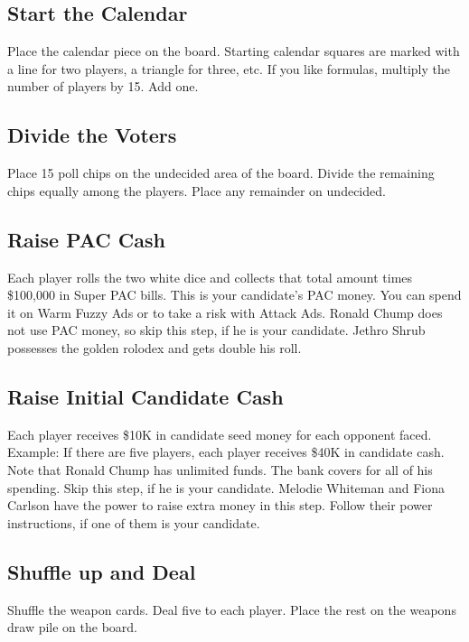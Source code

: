 \documentclass[twocolumn]{article}
\begin{document}
\subsection{Start the Calendar}

Place the calendar piece on the board.  Starting calendar squares are marked with a line for two players, a triangle for three, etc. If you like formulas,
multiply the number of players by 15. Add one.

\subsection{Divide the Voters}

Place 15 poll chips on the undecided area of the board. Divide the remaining chips equally among the players. Place any remainder on undecided.

\subsection{Raise PAC Cash}

Each player rolls the two white dice and collects that total amount times \$100,000 in Super PAC bills. This is your candidate's PAC money. You can spend it on Warm Fuzzy Ads or
to take a risk with Attack Ads. Ronald Chump does not use PAC money, so skip this step, if he is your candidate. Jethro Shrub possesses the golden rolodex and gets double his roll.

\subsection{Raise Initial Candidate Cash}

Each player receives \$10K in candidate seed money for each opponent faced. Example: If there are five players, each player receives \$40K in candidate cash.
Note that Ronald Chump has unlimited funds. The bank covers for all of his spending. Skip this step, if he is your candidate. Melodie Whiteman and Fiona Carlson
have the power to raise extra money in this step. Follow their power instructions, if one of them is your candidate.

\subsection{Shuffle up and Deal}

Shuffle the weapon cards. Deal five to each player. Place the rest on the weapons draw pile on the board.
\end{document}

